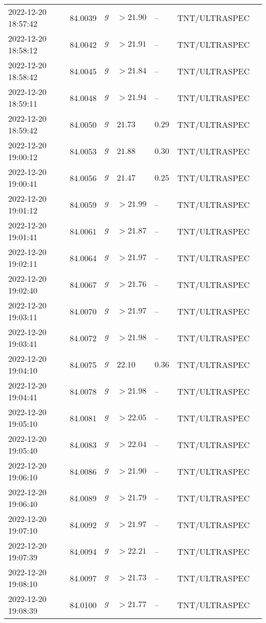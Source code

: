 \documentclass{nature_plusfigure}
\begin{document}
\begin{supplement}
\begin{center}
\begin{longtable}{lllllll}
2022-12-20 18:57:42 & 84.0039 & $g$ & $>21.90$ & -- & TNT/ULTRASPEC &  \\ 
2022-12-20 18:58:12 & 84.0042 & $g$ & $>21.91$ & -- & TNT/ULTRASPEC &  \\ 
2022-12-20 18:58:42 & 84.0045 & $g$ & $>21.84$ & -- & TNT/ULTRASPEC &  \\ 
2022-12-20 18:59:11 & 84.0048 & $g$ & $>21.94$ & -- & TNT/ULTRASPEC &  \\ 
2022-12-20 18:59:42 & 84.0050 & $g$ & $21.73$ & $0.29$ & TNT/ULTRASPEC &  \\ 
2022-12-20 19:00:12 & 84.0053 & $g$ & $21.88$ & $0.30$ & TNT/ULTRASPEC &  \\ 
2022-12-20 19:00:41 & 84.0056 & $g$ & $21.47$ & $0.25$ & TNT/ULTRASPEC &  \\ 
2022-12-20 19:01:12 & 84.0059 & $g$ & $>21.99$ & -- & TNT/ULTRASPEC &  \\ 
2022-12-20 19:01:41 & 84.0061 & $g$ & $>21.87$ & -- & TNT/ULTRASPEC &  \\ 
2022-12-20 19:02:11 & 84.0064 & $g$ & $>21.97$ & -- & TNT/ULTRASPEC &  \\ 
2022-12-20 19:02:40 & 84.0067 & $g$ & $>21.76$ & -- & TNT/ULTRASPEC &  \\ 
2022-12-20 19:03:11 & 84.0070 & $g$ & $>21.97$ & -- & TNT/ULTRASPEC &  \\ 
2022-12-20 19:03:41 & 84.0072 & $g$ & $>21.98$ & -- & TNT/ULTRASPEC &  \\ 
2022-12-20 19:04:10 & 84.0075 & $g$ & $22.10$ & $0.36$ & TNT/ULTRASPEC &  \\ 
2022-12-20 19:04:41 & 84.0078 & $g$ & $>21.98$ & -- & TNT/ULTRASPEC &  \\ 
2022-12-20 19:05:10 & 84.0081 & $g$ & $>22.05$ & -- & TNT/ULTRASPEC &  \\ 
2022-12-20 19:05:40 & 84.0083 & $g$ & $>22.04$ & -- & TNT/ULTRASPEC &  \\ 
2022-12-20 19:06:10 & 84.0086 & $g$ & $>21.90$ & -- & TNT/ULTRASPEC &  \\ 
2022-12-20 19:06:40 & 84.0089 & $g$ & $>21.79$ & -- & TNT/ULTRASPEC &  \\ 
2022-12-20 19:07:10 & 84.0092 & $g$ & $>21.97$ & -- & TNT/ULTRASPEC &  \\ 
2022-12-20 19:07:39 & 84.0094 & $g$ & $>22.21$ & -- & TNT/ULTRASPEC &  \\ 
2022-12-20 19:08:10 & 84.0097 & $g$ & $>21.73$ & -- & TNT/ULTRASPEC &  \\ 
2022-12-20 19:08:39 & 84.0100 & $g$ & $>21.77$ & -- & TNT/ULTRASPEC &  \\ 

\end{longtable}
\end{center}
\end{supplement}
\end{document}
